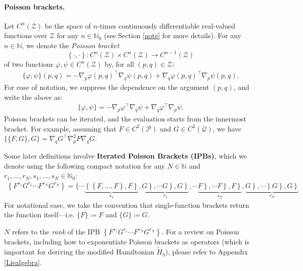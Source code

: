 \documentclass[11pt]{article}
\renewcommand{\P}{\mathcal{P}}
\newcommand{\Z}{\mathcal{Z}}
\newcommand{\N}{\mathbb{N}}
\newcommand{\Q}{\mathcal{Q}}
\begin{document}
\paragraph{Poisson brackets.} Let $C^{n}\left(\Z\right)$ be the space of $n$-times continuously differentiable real-valued functions over $\Z$ for any $n\in\N_{0}$ (see Section \ref{note} for more details). For any $n\in\N$, we denote the {\em Poisson bracket} 
$$\left\{\cdot,\cdot\right\}:C^{n}\left(\Z\right)\times C^{n}\left(\Z\right)\rightarrow C^{n-1}\left(\Z\right)$$ 
of two functions $\varphi,\psi\in C^{n}\left(\Z\right)$ by, for all $(p,q) \in \Z$:
\begin{align*}
    \{\varphi,\psi\}(p,q) = -\nabla_{p}\varphi(p,q)^\top\nabla_{q}\psi(p,q) + \nabla_{q}\varphi(p,q)^\top \nabla_{p}\psi(p,q).
\end{align*}
For ease of notation, we suppress the dependence on the argument $(p,q)$, and write the above as:
\begin{align*}
    \{\varphi,\psi\} = -\nabla_{p}\varphi^\top\nabla_{q}\psi+\nabla_{q}\varphi^\top\nabla_{p}\psi.
\end{align*}
Poisson brackets can be iterated, and the evaluation starts from the innermost bracket. For example, assuming that $F\in C^{2}\left(\P\right)$ and $G\in C^{2}\left(\Q\right)$, we have $\{\{F, G\}, G\}=\nabla_{q}G^{\top} \nabla_{p}^{2}F\nabla_{q}G$.

Some later definitions involve {\bf Iterated Poisson Brackets (IPBs)}, which we denote using the following compact notation for any $N \in \N$ and $r_{1},\dots,r_{N},s_{1},\dots,s_{N} \in \N_0$:
\begin{gather}
    \left\{F^{s_{1}}G^{r_{1}}\cdots F^{s_{N}}G^{r_{N}}\right\}\label{por} =\{\cdots\underbrace{\left\{\left\{F,\dots,F\right\},F\right\}}_{s_{1}},\underbrace{\left.\left.\left.G\right\},\cdots G\right\},G\right\}}_{r_{1}},\cdots\underbrace{\left.\left.\left.F\right\},\cdots F\right\},F\right\}}_{s_{N}},\underbrace{\left.\left.\left.\left.G\right\},\cdots\right\}G\right\},G\right\}}_{r_{N}}\nonumber
\end{gather}
For notational ease, we take the convention that single-function brackets return the function itself---i.e. $\{F\}\coloneqq F$ and $\{G\}\coloneqq G$.

$N$ refers to the \textit{rank} of the IPB $\left\{F^{s_{1}}G^{r_{1}}\cdots F^{s_{N}}G^{r_{N}}\right\}$.
For a review on Poisson brackets, including how to exponentiate Poisson brackets as operators (which is important for deriving the modified Hamiltonian $\widetilde{H}_{\eta}$), please refer to Appendix \ref{Liealgebra}.
\end{document}
